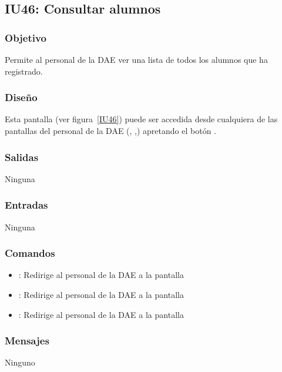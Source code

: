 
\subsection{IU46: Consultar alumnos}

\subsubsection{Objetivo}
Permite al personal de la DAE ver una lista de todos los alumnos que ha registrado.
\subsubsection{Diseño}
Esta pantalla  (ver figura~\ref{IU46}) puede ser accedida desde cualquiera de las pantallas del personal de la DAE (, ,) apretando el botón .


\subsubsection{Salidas}
Ninguna
\subsubsection{Entradas}
Ninguna
\subsubsection{Comandos}
\begin{itemize}
	\item {}: Redirige al personal de la DAE a la pantalla 
	\item {}: Redirige al personal de la DAE a la pantalla 
	\item {}: Redirige al personal de la DAE a la pantalla 
	
\end{itemize}

\subsubsection{Mensajes}
Ninguno
